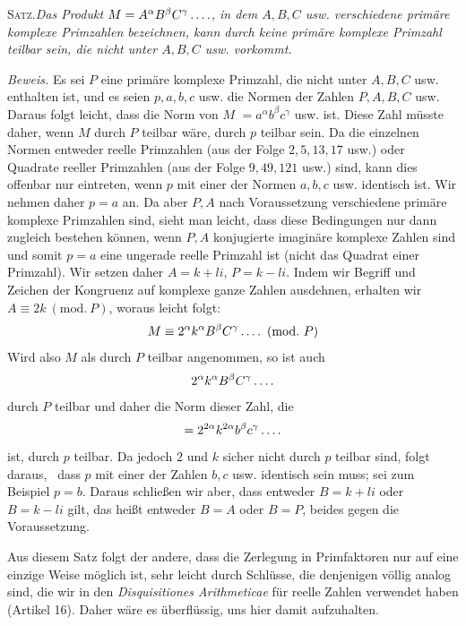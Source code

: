 \textsc{Satz.}\quad\emph{Das Produkt $M=A^\alpha B^\beta C^\gamma\mathinner{.\,.\,.\,.}$, in dem $A,B,C$ usw. verschiedene primäre komplexe Primzahlen bezeichnen, kann durch keine primäre komplexe Primzahl teilbar sein, die nicht unter $A,B,C$ usw. vorkommt.}

\begingroup{}\relax
\emph{Beweis.} Es sei $P$ eine primäre komplexe Primzahl, die nicht unter $A,B,C$ usw. enthalten ist, und es seien $p,a,b,c$ usw. die Normen der Zahlen $P,A,B,C$ usw. Daraus folgt leicht, dass die Norm von $M$ $=a^\alpha b^\beta c^\gamma$ usw. ist. Diese Zahl müsste daher, wenn $M$ durch $P$ teilbar wäre, durch $p$ teilbar sein. Da die einzelnen Normen entweder reelle Primzahlen (aus der Folge $2,5,13,17$ usw.) oder Quadrate reeller Primzahlen (aus der Folge $9,49,121$ usw.) sind, kann dies offenbar nur eintreten, wenn $p$ mit einer der Normen $a,b,c$ usw. identisch ist. Wir nehmen daher $p=a$ an. Da aber $P,A$ nach Voraussetzung verschiedene primäre komplexe Primzahlen sind, sieht man leicht, dass diese Bedingungen nur dann zugleich bestehen können, wenn $P,A$ konjugierte imaginäre komplexe Zahlen sind und somit $p=a$ eine ungerade reelle Primzahl ist (nicht das Quadrat einer Primzahl). Wir setzen daher $A=k+li$, $P=k-li$. Indem wir Begriff und Zeichen der Kongruenz auf komplexe ganze Zahlen ausdehnen, erhalten wir $A\equiv2k\ (\mathrm{mod.}\ P)$, woraus leicht folgt:
\[
M\equiv2^\alpha k^\alpha B^\beta C^\gamma\mathinner{.\,.\,.\,.}\ (\mathrm{mod.}\ P)
\]
Wird also $M$ als durch $P$ teilbar angenommen, so ist auch
\[
2^\alpha k^\alpha B^\beta C^\gamma\mathinner{.\,.\,.\,.}
\]
durch $P$ teilbar und daher die Norm dieser Zahl, die
\[
=2^{2\alpha}k^{2\alpha}b^\beta c^\gamma\mathinner{.\,.\,.\,.}
\]
ist, durch $p$ teilbar. Da jedoch $2$ und $k$ sicher nicht durch $p$ teilbar sind, folgt daraus,\ %
dass $p$ mit einer der Zahlen $b,c$ usw. identisch sein muss; sei zum Beispiel $p=b$. Daraus schließen wir aber, dass entweder $B=k+li$ oder $B=k-li$ gilt, das heißt entweder $B=A$ oder $B=P$, beides gegen die Voraussetzung.\endgroup

Aus diesem Satz folgt der andere, dass die Zerlegung in Primfaktoren nur auf eine einzige Weise möglich ist, sehr leicht durch Schlüsse, die denjenigen völlig analog sind, die wir in den \emph{Disquisitiones Arithmeticae} für reelle Zahlen verwendet haben (Artikel 16). Daher wäre es überflüssig, uns hier damit aufzuhalten.

